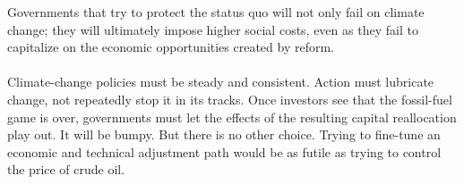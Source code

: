 \documentclass{article}
\begin{document}
Governments that try to protect the status quo will not only fail on climate change; they will ultimately impose higher social costs, even as they fail to capitalize on the economic opportunities created by reform.\\\\Climate{-}change policies must be steady and consistent. Action must lubricate change, not repeatedly stop it in its tracks. Once investors see that the fossil{-}fuel game is over, governments must let the effects of the resulting capital reallocation play out. It will be bumpy. But there is no other choice. Trying to fine{-}tune an economic and technical adjustment path would be as futile as trying to control the price of crude oil.\\\\
\end{document}
